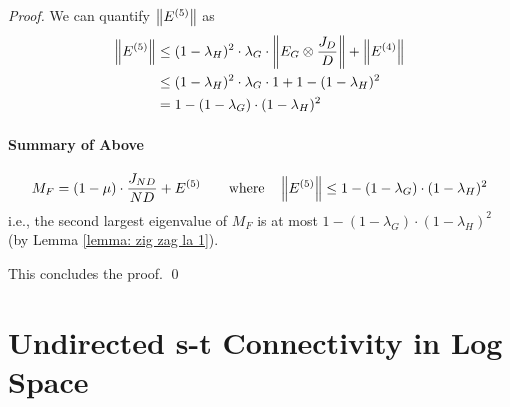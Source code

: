 \begin{proof}
	We can quantify $\left\lVert E^{(5)}\right\rVert$ as 
	\begin{align}
		\left\lVert E^{(5)}\right\rVert
		& \leq ( 1- \lambda_H)^2 \cdot \lambda_G \cdot \left\lVert E_G \otimes \frac{J_D}{D}\right\rVert + \left\lVert E^{(4)}\right\rVert \\
		& \leq ( 1- \lambda_H)^2 \cdot \lambda_G \cdot 1 + 1 - (1 - \lambda_H) ^2 \\
		& = {1 - (1 - \lambda_G) \cdot (1 - \lambda_H) ^ 2}
	\end{align}
	
	\begin{mdframed}
		\paragraph{Summary of Above}
		\begin{equation}
			M_F = (1 - \mu) \cdot \frac{J_{ND}}{ND} + E^{(5)} \quad\quad \text{where} \quad \left\lVert E^{(5)}\right\rVert \leq 1 - (1 - \lambda_G) \cdot (1 - \lambda_H) ^ 2
		\end{equation}
		i.e., the second largest eigenvalue of $M_F$ is at most $1 - (1 - \lambda_G) \cdot (1 - \lambda_H) ^ 2$ (by Lemma \ref{lemma: zig zag la 1}). 
	\end{mdframed}
	
	This concludes the proof. \qed
\end{proof}


\section{Undirected s-t Connectivity in Log Space}

